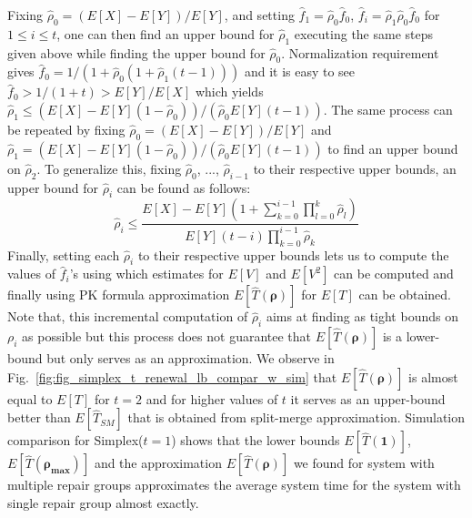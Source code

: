 \documentclass[sigconf,draft]{acmart}
\begin{document}
Fixing $\hat{\rho}_0 = (E[X] - E[Y])/E[Y]$, and setting $\hat{f}_1 = \hat{\rho}_0\hat{f}_0$, $\hat{f}_i = \hat{\rho}_1\hat{\rho}_0\hat{f}_0$ for $1 \leq i \leq t$, one can then find an upper bound for $\hat{\rho}_1$ executing the same steps given above while finding the upper bound for $\hat{\rho}_0$. Normalization requirement gives $\hat{f}_0 = 1/(1+\hat{\rho}_0(1+\hat{\rho}_1(t-1)))$ and it is easy to see $\hat{f}_0 > 1/(1+t) > E[Y]/E[X]$ which yields $\hat{\rho}_1 \leq (E[X]-E[Y](1-\hat{\rho}_0))/(\hat{\rho}_0 E[Y](t-1))$. The same process can be repeated by fixing $\hat{\rho}_0 = (E[X] - E[Y])/E[Y]$ and $\hat{\rho}_1 = (E[X]-E[Y](1-\hat{\rho}_0))/(\hat{\rho}_0 E[Y](t-1))$ to find an upper bound on $\hat{\rho}_2$. To generalize this, fixing $\hat{\rho}_0$, ..., $\hat{\rho}_{i-1}$ to their respective upper bounds, an upper bound for $\hat{\rho}_i$ can be found as follows:
\begin{equation*}
  \hat{\rho}_i \leq \frac{E[X]-E[Y](1+\sum_{k=0}^{i-1} \prod_{l=0}^{k} \hat{\rho}_l)}{E[Y](t-i)\prod_{k=0}^{i-1} \hat{\rho}_k}
\end{equation*}
Finally, setting each $\hat{\rho}_i$ to their respective upper bounds lets us to compute the values of $\hat{f}_i$'s using which estimates for $E[V]$ and $E[V^2]$ can be computed and finally using PK formula approximation $E[\hat{T}(\bm{\rho})]$ for $E[T]$ can be obtained. Note that, this incremental computation of $\hat{\rho}_i$ aims at finding as tight bounds on $\rho_i$ as possible but this process does not guarantee that $E[\hat{T}(\bm{\rho})]$ is a lower-bound but only serves as an approximation. We observe in Fig.~\ref{fig:fig_simplex_t_renewal_lb_compar_w_sim} that $E[\hat{T}(\bm{\rho})]$ is almost equal to $E[T]$ for $t=2$ and for higher values of $t$ it serves as an upper-bound better than $E[\hat{T}_{SM}]$ that is obtained from split-merge approximation. Simulation comparison for Simplex($t=1$) shows that the lower bounds $E[\hat{T}(\bm{1})]$, $E[\hat{T}(\bm{\rho_{max}})]$ and the approximation $E[\hat{T}(\bm{\rho})]$ we found for system with multiple repair groups approximates the average system time for the system with single repair group almost exactly.
\end{document}
